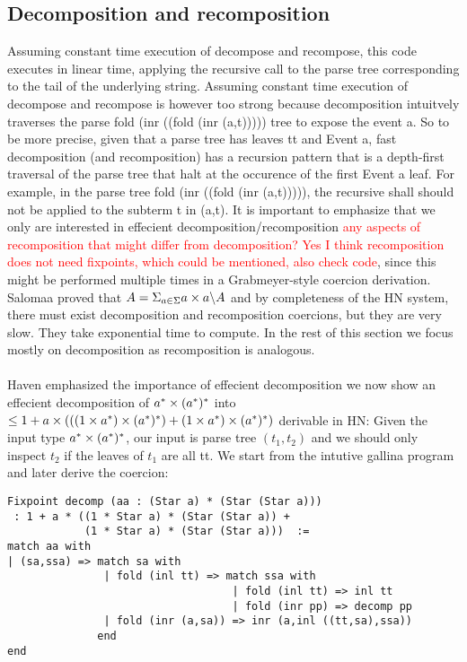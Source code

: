\documentclass[a4paper,UKenglish,cleveref, autoref, thm-restate]{lipics-v2021}
\newcommand\mycomment[1]{\textcolor{red}{#1}}
\begin{document}
\subsection{Decomposition and recomposition}
Assuming constant time execution of \textsf{decompose} and \textsf{recompose}, this code executes in linear time, applying the recursive call to the parse tree corresponding to the tail of the underlying string. Assuming constant time execution of \textsf{decompose} and \textsf{recompose} is however too strong because decomposition intuitvely traverses the parse \textsf{fold (inr ((fold (inr (a,t)))))} tree to expose the event \textsf{a}. So to be more precise, given that a parse tree has leaves \textsf{tt} and \textsf{Event a}, fast decomposition (and recomposition) has a recursion pattern that is a depth-first traversal of the parse tree that halt at the occurence of the first \textsf{Event a} leaf. For example, in the parse tree \textsf{fold (inr ((fold (inr (a,t)))))}, the recursive shall should not be applied to the subterm \textsf{t} in \textsf{(a,t)}. It is important to emphasize that we only are interested in effecient decomposition/recomposition \mycomment{any aspects of recomposition that might differ from decomposition? Yes I think recomposition does not need fixpoints, which could be mentioned, also check code}, since this might be performed multiple times in a Grabmeyer-style coercion derivation. Salomaa proved that $A = \Sigma_{a \in \Sigma} a\times a \backslash A$ and by completeness of the HN system, there must exist decomposition and recomposition coercions, but they are very slow. They take exponential time to compute. In the rest of this section we focus mostly on decomposition as recomposition is analogous.\\\\
Haven emphasized the importance of effecient decomposition we now show an effecient decomposition of $a^*\times ({a^*})^*$ into $\leq 1 + a \times (((1 \times a^*) \times ({a^*})^*) + (1 \times a^*) \times ({a^*})^*)$ derivable in HN: Given the input type $a^*\times ({a^*})^*$, our input is parse tree $(t_1,t_2)$ and we should only inspect $t_2$ if the leaves of $t_1$ are all \textsf{tt}. We start from the intutive gallina program and later derive the coercion:\\
\begin{verbatim}
Fixpoint decomp (aa : (Star a) * (Star (Star a))) 
 : 1 + a * ((1 * Star a) * (Star (Star a)) + 
            (1 * Star a) * (Star (Star a)))  := 
match aa with 
| (sa,ssa) => match sa with 
               | fold (inl tt) => match ssa with 
                                   | fold (inl tt) => inl tt
                                   | fold (inr pp) => decomp pp
               | fold (inr (a,sa)) => inr (a,inl ((tt,sa),ssa))
              end
end
\end{verbatim}
\end{document}
